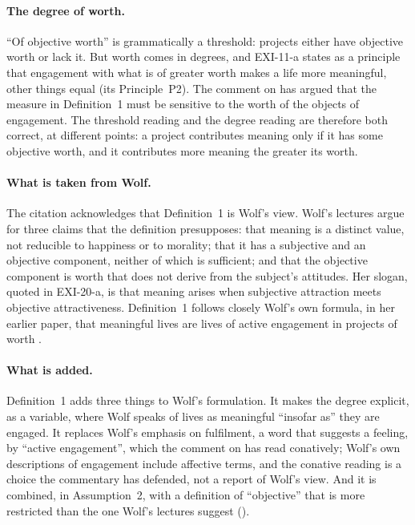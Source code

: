 \paragraph{The degree of worth.} \enquote{Of objective worth} is grammatically a threshold: projects either have objective worth or lack it. But worth comes in degrees, and EXI-11-a states as a principle that engagement with what is of greater worth makes a life more meaningful, other things equal (its Principle~P2). The comment on  has argued that the measure in Definition~1 must be sensitive to the worth of the objects of engagement. The threshold reading and the degree reading are therefore both correct, at different points: a project contributes meaning only if it has some objective worth, and it contributes more meaning the greater its worth.


\paragraph{What is taken from Wolf.} The citation acknowledges that Definition~1 is Wolf's view. Wolf's lectures argue for three claims that the definition presupposes: that meaning is a distinct value, not reducible to happiness or to morality; that it has a subjective and an objective component, neither of which is sufficient; and that the objective component is worth that does not derive from the subject's attitudes. Her slogan, quoted in EXI-20-a, is that meaning arises when subjective attraction meets objective attractiveness. Definition~1 follows closely Wolf's own formula, in her earlier paper, that meaningful lives are lives of active engagement in projects of worth \citep{Wolf1997}.

\paragraph{What is added.} Definition~1 adds three things to Wolf's formulation. It makes the degree explicit, as a variable, where Wolf speaks of lives as meaningful \enquote{insofar as} they are engaged. It replaces Wolf's emphasis on fulfilment, a word that suggests a feeling, by \enquote{active engagement}, which the comment on  has read conatively; Wolf's own descriptions of engagement include affective terms, and the conative reading is a choice the commentary has defended, not a report of Wolf's view. And it is combined, in Assumption~2, with a definition of \enquote{objective} that is more restricted than the one Wolf's lectures suggest ().

